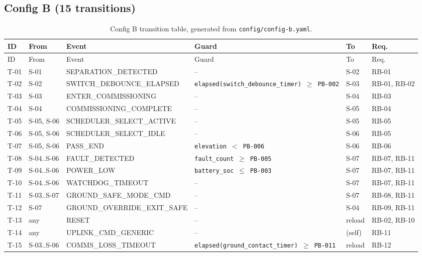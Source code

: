 \subsection{Config B (15 transitions)}\label{app:trans-b}
{\scriptsize
\begin{longtable}{@{}p{}p{}p{}p{}p{}p{}@{}}
\caption{Config B transition table, generated from \texttt{config/config-b.yaml}.}\\
\toprule
ID & From & Event & Guard & To & Req. \\
\midrule
\endfirsthead
\toprule
ID & From & Event & Guard & To & Req. \\
\midrule
\endhead
T-01 & S-01 & SEPARATION\_\allowbreak DETECTED & -- & S-02 & \mbox{RB-01} \\
T-02 & S-02 & SWITCH\_\allowbreak DEBOUNCE\_\allowbreak ELAPSED & \texttt{elapsed(switch\_\allowbreak debounce\_\allowbreak timer) $\geq$ PB-002} & S-03 & \mbox{RB-01}, \mbox{RB-02} \\
T-03 & S-03 & ENTER\_\allowbreak COMMISSIONING & -- & S-04 & \mbox{RB-03} \\
T-04 & S-04 & COMMISSIONING\_\allowbreak COMPLETE & -- & S-05 & \mbox{RB-04} \\
T-05 & S-05, S-06 & SCHEDULER\_\allowbreak SELECT\_\allowbreak ACTIVE & -- & S-05 & \mbox{RB-05} \\
T-06 & S-05, S-06 & SCHEDULER\_\allowbreak SELECT\_\allowbreak IDLE & -- & S-06 & \mbox{RB-05} \\
T-07 & S-05, S-06 & PASS\_\allowbreak END & \texttt{elevation $<$ PB-006} & S-06 & \mbox{RB-06} \\
T-08 & S-04..S-06 & FAULT\_\allowbreak DETECTED & \texttt{fault\_\allowbreak count $\geq$ PB-005} & S-07 & \mbox{RB-07}, \mbox{RB-11} \\
T-09 & S-04..S-06 & POWER\_\allowbreak LOW & \texttt{battery\_\allowbreak soc $\leq$ PB-003} & S-07 & \mbox{RB-07}, \mbox{RB-11} \\
T-10 & S-04..S-06 & WATCHDOG\_\allowbreak TIMEOUT & -- & S-07 & \mbox{RB-07}, \mbox{RB-11} \\
T-11 & S-03..S-07 & GROUND\_\allowbreak SAFE\_\allowbreak MODE\_\allowbreak CMD & -- & S-07 & \mbox{RB-08}, \mbox{RB-11} \\
T-12 & S-07 & GROUND\_\allowbreak OVERRIDE\_\allowbreak EXIT\_\allowbreak SAFE & -- & S-04 & \mbox{RB-09}, \mbox{RB-11} \\
T-13 & any & RESET & -- & reload & \mbox{RB-02}, \mbox{RB-10} \\
T-14 & any & UPLINK\_\allowbreak CMD\_\allowbreak GENERIC & -- & (self) & \mbox{RB-11} \\
T-15 & S-03..S-06 & COMMS\_\allowbreak LOSS\_\allowbreak TIMEOUT & \texttt{elapsed(ground\_\allowbreak contact\_\allowbreak timer) $\geq$ PB-011} & reload & \mbox{RB-12} \\
\bottomrule
\end{longtable}}

